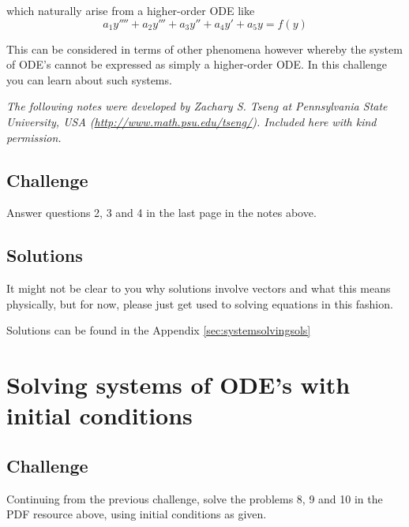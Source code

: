 which naturally arise from a higher-order ODE like
\begin{equation}
    a_1 y'''' + a_2 y''' + a_3 y'' + a_4 y' + a_5 y = f(y)
\end{equation}

This can be considered in terms of other phenomena however whereby the system of ODE's cannot be expressed as simply a higher-order ODE. In this challenge you can learn about such systems.

\emph{The following notes were developed by Zachary S. Tseng at Pennsylvania State University, USA (\url{http://www.math.psu.edu/tseng/}). Included here with kind permission.}



\subsection*{Challenge}
\label{sec:systemsolvingchallenges}
Answer questions 2, 3 and 4 in the last page in the notes above.

\subsection*{Solutions}
It might not be clear to you why solutions involve vectors and what this means physically, but for now, please just get used to solving equations in this fashion.

Solutions can be found in the Appendix \ref{sec:systemsolvingsols}






\newpage
\section{Solving systems of ODE's with initial conditions}
\label{sec:systemsolvinginit}

\subsection*{Challenge}
\label{sec:systemsolvinginitchallenges}
Continuing from the previous challenge, solve the problems 8, 9 and 10 in the PDF resource above, using initial conditions as given.

